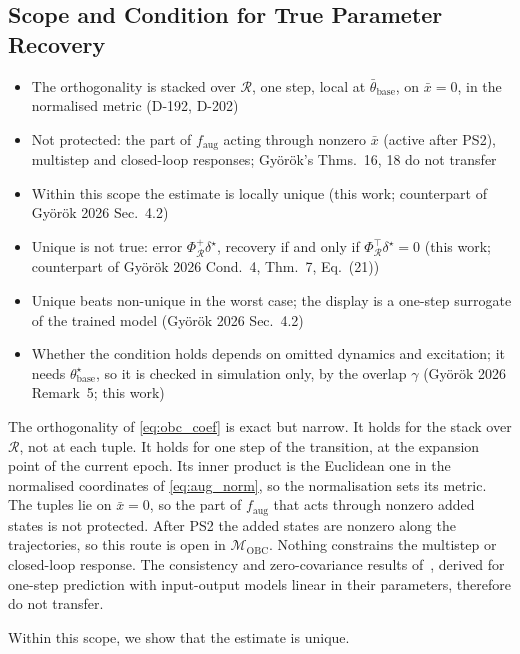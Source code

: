 \subsection{Scope and Condition for True Parameter Recovery}\label{sec:obc_scope}
\ifdraft
\begin{itemize}
\item The orthogonality is stacked over $\mathcal R$, one step, local at $\bar\theta_{\mathrm{base}}$, on $\bar x=0$, in the normalised metric (D-192, D-202)
\item Not protected: the part of $f_{\mathrm{aug}}$ acting through nonzero $\bar x$ (active after PS2), multistep and closed-loop responses; Gy\"or\"ok's Thms.~16, 18 do not transfer
\item Within this scope the estimate is locally unique (this work; counterpart of Gy\"or\"ok 2026 Sec.~4.2)
\item Unique is not true: error $\Phi_{\mathcal R}^{+}\delta^\star$, recovery if and only if $\Phi_{\mathcal R}^\top\delta^\star=0$ (this work; counterpart of Gy\"or\"ok 2026 Cond.~4, Thm.~7, Eq.~(21))
\item Unique beats non-unique in the worst case; the display is a one-step surrogate of the trained model (Gy\"or\"ok 2026 Sec.~4.2)
\item Whether the condition holds depends on omitted dynamics and excitation; it needs $\theta^\star_{\mathrm{base}}$, so it is checked in simulation only, by the overlap $\gamma$ (Gy\"or\"ok 2026 Remark~5; this work)
\end{itemize}
\fi

The orthogonality of \eqref{eq:obc_coef} is exact but narrow.
It holds for the stack over $\mathcal R$, not at each tuple.
It holds for one step of the transition, at the expansion point of the current
epoch.
Its inner product is the Euclidean one in the normalised coordinates of
\eqref{eq:aug_norm}, so the normalisation sets its metric.
The tuples lie on $\bar x=0$, so the part of $f_{\mathrm{aug}}$ that acts
through nonzero added states is not protected.
After PS2 the added states are nonzero along the trajectories, so this route
is open in $\mathcal M_{\mathrm{OBC}}$.
Nothing constrains the multistep or closed-loop response.
The consistency and zero-covariance results
of~\cite[Thms.~16, 18]{gyorok2026obc}, derived for one-step prediction with
input-output models linear in their parameters, therefore do not transfer.

Within this scope, we show that the estimate is unique.

